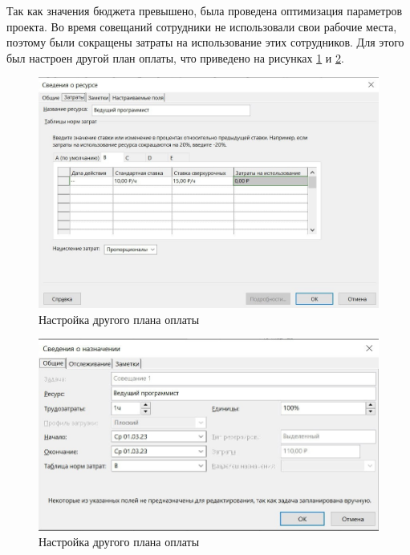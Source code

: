 Так как значения бюджета превышено, была проведена оптимизация параметров проекта. Во время совещаний сотрудники не использовали свои рабочие места, поэтому были сокращены затраты на использование этих сотрудников. Для этого был настроен другой план оплаты, что приведено на рисунках \ref{img:task2-b} и \ref{img:task2-b2}.

\begin{figure}[H]
	\begin{center}
		\includegraphics[scale=0.3]{inc/img/task2-b.jpg}
	\end{center}
	\captionsetup{justification=centering}
	\caption{Настройка другого плана оплаты}
	\label{img:task2-b}
\end{figure}

\begin{figure}[H]
	\begin{center}
		\includegraphics[scale=0.3]{inc/img/task2-b2.jpg}
	\end{center}
	\captionsetup{justification=centering}
	\caption{Настройка другого плана оплаты}
	\label{img:task2-b2}
\end{figure}

